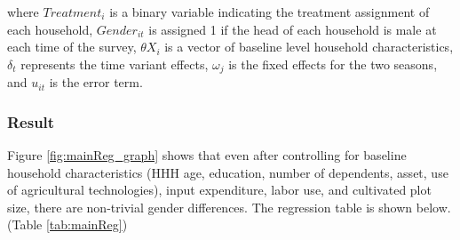 \documentclass[12pt]{article}
\begin{document}
	where $Treatment_{i}$ is a binary variable indicating the treatment assignment of each household, 
	$Gender_{it}$ is assigned 1 if the head of each household is male at each time of the survey, $\theta X_{i}$ is a vector of baseline level household characteristics, $\delta_{t}$ represents the time variant effects, $\omega_{j}$ is the fixed effects for the two seasons, and $u_{it}$ is the error term.
	
\subsubsection*{Result}
Figure \ref{fig:mainReg_graph} shows that even after controlling for baseline household characteristics (HHH age, education, number of dependents, asset, use of agricultural technologies), input expenditure, labor use, and cultivated plot size, there are non-trivial gender differences. The regression table is shown below. (Table \ref{tab:mainReg})
\end{document}

